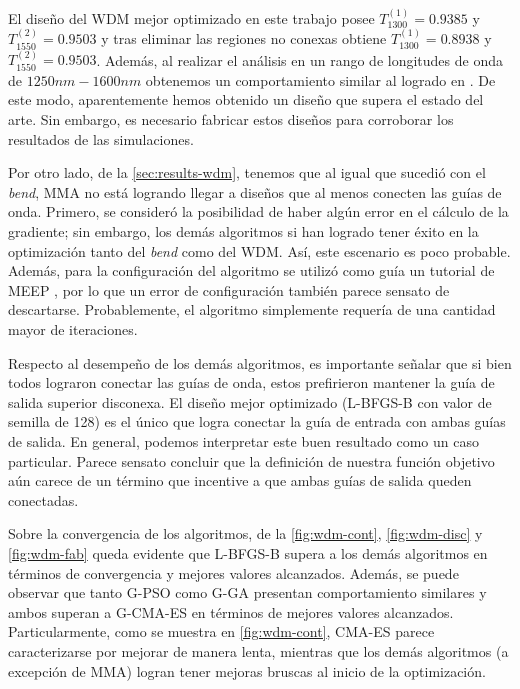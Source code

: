 El diseño del WDM mejor optimizado en este trabajo posee $T_{1300}^{(1)} = 0.9385$ y 
$T_{1550}^{(2)} = 0.9503$ y tras eliminar las regiones no conexas obtiene
$T_{1300}^{(1)} = 0.8938$ y $T_{1550}^{(2)} = 0.9503$. Además, al realizar el análisis
en un rango de longitudes de onda de $1250nm-1600nm$ obtenemos un comportamiento similar
al logrado en \cite{Piggott2015}.
De este modo, aparentemente hemos obtenido un diseño que supera el estado del arte.
Sin embargo, es necesario fabricar estos diseños para corroborar los resultados de las simulaciones.

Por otro lado, de la \autoref{sec:results-wdm}, tenemos que al igual que sucedió con el \emph{bend},
MMA no está logrando llegar a diseños que al menos conecten las guías de onda.
Primero, se consideró la posibilidad de haber algún error en el cálculo de la gradiente;
sin embargo, los demás algoritmos si han logrado tener éxito en la optimización tanto del \emph{bend}
como del WDM. Así, este escenario es poco probable.
Además, para la configuración del algoritmo se utilizó como guía un tutorial de MEEP \citep{Oskooi2010},
por lo que un error de configuración también parece sensato de descartarse.
Probablemente, el algoritmo simplemente requería de una cantidad mayor de iteraciones.


Respecto al desempeño de los demás algoritmos, es importante señalar que si bien todos lograron
conectar las guías de onda, estos prefirieron mantener la guía de salida superior disconexa.
El diseño mejor optimizado (L-BFGS-B con valor de semilla de 128) es el único que logra conectar
la guía de entrada con ambas guías de salida.
En general, podemos interpretar este buen resultado como un caso particular.
Parece sensato concluir que la definición de nuestra función objetivo aún carece de un
término que incentive a que ambas guías de salida queden conectadas.


Sobre la convergencia de los algoritmos, de la \autoref{fig:wdm-cont}, \autoref{fig:wdm-disc}
y \autoref{fig:wdm-fab} queda evidente que L-BFGS-B supera a los demás algoritmos en términos
de convergencia y mejores valores alcanzados.
Además, se puede observar que tanto G-PSO como G-GA presentan comportamiento similares y ambos
superan a G-CMA-ES en términos de mejores valores alcanzados.
Particularmente, como se muestra en \autoref{fig:wdm-cont}, CMA-ES parece caracterizarse
por mejorar de manera lenta, mientras que los demás algoritmos (a excepción de MMA) logran tener
mejoras bruscas al inicio de la optimización.



